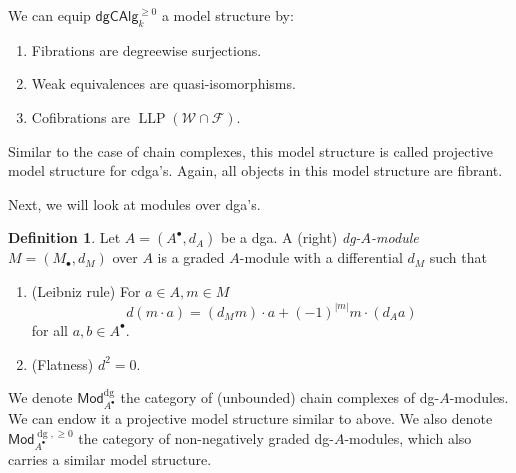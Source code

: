 \documentclass[12pt]{amsart}
\theoremstyle{definition}
\newtheorem{defn}[thm]{Definition}
\theoremstyle{remark}
\numberwithin{equation}{section}
\newcommand{\1}{{\mathbb{1}}}
\newcommand{\Mod}{\mathsf{Mod}}
\newcommand{\dgcalg}{\mathsf{dgCAlg}}
\newcommand{\bt}{\bullet}
\newcommand{\dg}{{\operatorname{dg}}}
\newcommand{\LLP}{\operatorname{LLP}}
\begin{document}
    We can equip  $\dgcalg_k^{\ge 0}$ a model structure by:
    \begin{enumerate}
        \item Fibrations are degreewise surjections.
        \item Weak equivalences are quasi-isomorphisms.
        \item Cofibrations are $\LLP(\mathcal{W}\cap \mathcal{F})$.
    \end{enumerate}
    Similar to the case of chain complexes, this model structure is called projective model structure for cdga's. Again, all objects in this model structure are fibrant. 
    
    Next, we will look at modules over dga's.
    \begin{defn}
        Let $A=(A^{\bt}, d_A)$ be a dga. A (right) {\it dg-$A$-module}  $M=(M_{\bt}, d_M)$ over $A$ is a graded $A$-module with a differential $d_M$ such that
        \begin{enumerate}
            \item (Leibniz rule) For $a\in A, m \in M$
        \begin{equation*}
            d(m\cdot a ) = (d_M m)\cdot a + (-1)^{|m|}m\cdot (d_{A}a)
        \end{equation*}
        for all $a, b \in A^{\bt}$.
        \item (Flatness) $d^2=0$.
        \end{enumerate}
    \end{defn}
    We denote $\Mod_{A^{\bt}}^{\dg}$ the category of (unbounded) chain complexes of dg-$A$-modules. We can endow it a projective model structure similar to above. We also denote $\Mod_{A^{\bt}}^{\dg,\ge0}$ the category of non-negatively graded dg-$A$-modules, which also carries a similar model structure.
    
\end{document}
